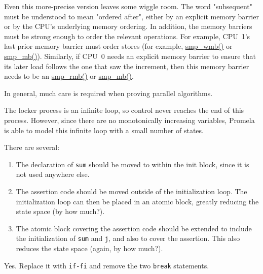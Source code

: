 	Even this more-precise version leaves some wiggle room.
	The word "subsequent" must be understood to mean "ordered after",
	either by an explicit memory barrier or by the CPU's underlying
	memory ordering.
	In addition, the memory barriers must be strong enough to order
	the relevant operations.
	For example, CPU~1's last prior memory barrier must order stores
	(for example, \url{smp_wmb()} or \url{smp_mb()}).
	Similarly, if CPU~0 needs an explicit memory barrier to
	ensure that its later load follows the one that saw the increment,
	then this memory barrier needs to be an \url{smp_rmb()}
	or \url{smp_mb()}.

	In general, much care is required when proving parallel algorithms.


The locker process is an infinite loop, so control
never reaches the end of this process.
However, since there are no monotonically increasing variables,
Promela is able to model this infinite loop with a small
number of states.


There are several:
\begin{enumerate}
\item	The declaration of {\tt sum} should be moved to within
	the init block, since it is not used anywhere else.
\item	The assertion code should be moved outside of the
	initialization loop.  The initialization loop can
	then be placed in an atomic block, greatly reducing
	the state space (by how much?).
\item	The atomic block covering the assertion code should
	be extended to include the initialization of {\tt sum}
	and {\tt j}, and also to cover the assertion.
	This also reduces the state space (again, by how
	much?).
\end{enumerate}


Yes.  Replace it with {\tt if-fi} and remove the two {\tt break} statements.


